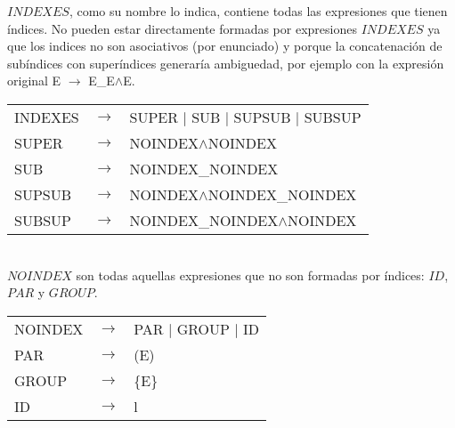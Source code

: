 $INDEXES$, como su nombre lo indica, contiene todas las expresiones que tienen \'indices. No pueden estar directamente formadas por expresiones $INDEXES$ ya que los indices no son asociativos (por enunciado) y porque la concatenaci\'on
de sub\'indices con super\'indices generar\'ia ambiguedad, por ejemplo con la expresi\'on original E $\rightarrow$ E\_E$\wedge$E. \\


\begin{tabular}{ l c l }
    INDEXES &  $\rightarrow$ & SUPER $|$ SUB $|$ SUPSUB $|$ SUBSUP \\
    SUPER &    $\rightarrow$ & NOINDEX$\wedge$NOINDEX \\
    SUB &      $\rightarrow$ & NOINDEX\_NOINDEX \\
    SUPSUB &   $\rightarrow$ & NOINDEX$\wedge$NOINDEX\_NOINDEX \\
    SUBSUP &   $\rightarrow$ & NOINDEX\_NOINDEX$\wedge$NOINDEX \\
\end{tabular}\\

$NOINDEX$ son todas aquellas expresiones que no son formadas por \'indices: $ID$, $PAR$ y $GROUP$. \\


\begin{tabular}{ l c l }
    NOINDEX &  $\rightarrow$ & PAR $|$ GROUP $|$ ID \\    
    PAR &      $\rightarrow$ & (E) \\
    GROUP &    $\rightarrow$ & \{E\} \\
    ID &       $\rightarrow$ & l \\
\end{tabular} \\
